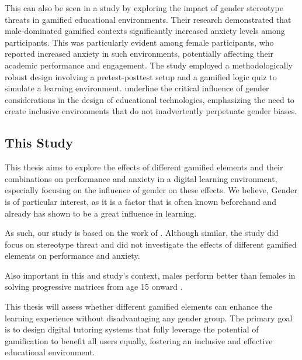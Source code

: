 This can also be seen in a study by \textcite{albuquerqueDoesGenderStereotype2017} exploring the impact of gender stereotype threats in gamified educational environments.
Their research demonstrated that male-dominated gamified contexts significantly increased anxiety levels among participants.
This was particularly evident among female participants, who reported increased anxiety in such environments, potentially affecting their academic performance and engagement.
The study employed a methodologically robust design involving a pretest-posttest setup and a gamified logic quiz to simulate a learning environment.
\textcite{albuquerqueDoesGenderStereotype2017} underline the critical influence of gender considerations in the design of educational technologies, emphasizing the need to create inclusive environments that do not inadvertently perpetuate gender biases. 

\subsection{This Study}
This thesis aims to explore the effects of different gamified elements and their combinations on performance and anxiety in a digital learning environment, especially focusing on the influence of gender on these effects.
We believe, Gender is of particular interest, as it is a factor that is often known beforehand and already has shown to be a great influence in learning.

As such, our study is based on the work of \textcite{albuquerqueDoesGenderStereotype2017}.
Although similar, the study did focus on stereotype threat and did not investigate the effects of different gamified elements on performance and anxiety.

Also important in this and \textcite{albuquerqueDoesGenderStereotype2017} study's context, males perform better than females in solving progressive matrices from age 15 onward \parencite{lynnSexDifferencesProgressive2004}.

This thesis will assess whether different gamified elements can enhance the learning experience without disadvantaging any gender group.
The primary goal is to design digital tutoring systems that fully leverage the potential of gamification to benefit all users equally, fostering an inclusive and effective educational environment.

